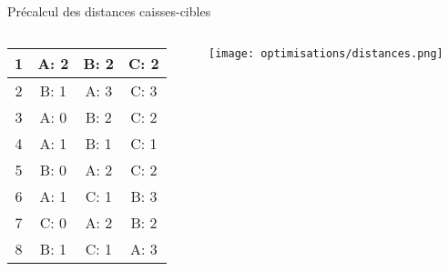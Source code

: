 \begin{frame}{Précalcul des distances caisses-cibles}
\begin{columns}[onlytextwidth]
{\begin{column}{0.4\textwidth}
\begin{tabular}{|c|c|c|c|}
                                                  1 & A: 2 & B: 2 & C: 2 \\ \hline
                                                  2 & B: 1 & A: 3 & C: 3 \\ \hline
                                                  3 & A: 0 & B: 2 & C: 2 \\ \hline
                                                  4 & A: 1 & B: 1 & C: 1 \\ \hline
                                                  5 & B: 0 & A: 2 & C: 2 \\ \hline
                                                  6 & A: 1 & C: 1 & B: 3 \\ \hline
                                                  7 & C: 0 & A: 2 & B: 2 \\ \hline
                                                  8 & B: 1 & C: 1 & A: 3 \\ \hline
                        \end{tabular}
                    \end{column}
                }
                \begin{column}{0.5\textwidth}
                    \texttt{[image: optimisations/distances.png]}
                \end{column}

            \end{columns}
        \end{frame}

        

